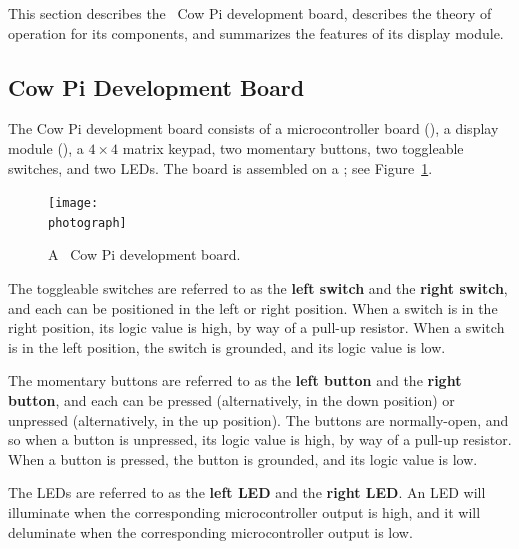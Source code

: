 
This section describes the \hardwareversion\ Cow Pi development board, describes the theory of operation for its components, and summarizes the features of its display module.

\subsection{Cow Pi Development Board}

The Cow Pi development board consists of a microcontroller board (\mcuboard), a display module (\displaymoduledescription), a $4 \times 4$ matrix keypad, two momentary buttons, two toggleable switches, and two LEDs.
The board is assembled on a \construction; see Figure~\ref{fig:photograph}.

\begin{figure}
    \centering
    \texttt{[image: \\photograph]}
    \caption{A \hardwareversion\ Cow Pi development board.}\label{fig:photograph}
\end{figure}

The toggleable switches are referred to as the \textbf{left switch} and the \textbf{right switch}, and each can be positioned in the left or right position.
When a switch is in the right position, its logic value is high, by way of a pull-up resistor.
When a switch is in the left position, the switch is grounded, and its logic value is low.

The momentary buttons are referred to as the \textbf{left button} and the \textbf{right button}, and each can be pressed (alternatively, in the down position) or unpressed (alternatively, in the up position).
The buttons are normally-open, and so when a button is unpressed, its logic value is high, by way of a pull-up resistor.
When a button is pressed, the button is grounded, and its logic value is low.

The LEDs are referred to as the \textbf{left LED} and the \textbf{right LED}.
An LED will illuminate when the corresponding microcontroller output is high, and it will deluminate when the corresponding microcontroller output is low.


